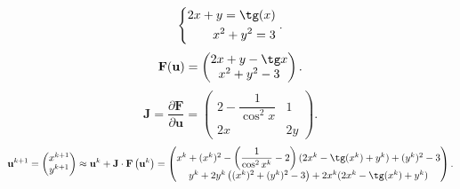 \documentclass[a4paper]{article}
\title{}
\begin{document}
	\maketitle
\[
\left\{
\begin{aligned}
	2 x +y = \tg (x) \\
	x^2 +y^2 =3
\end{aligned}
\right.
.\] 
\[
	\mathbf{F}(\mathbf{u})=
	\begin{pmatrix} 2x+y -\tg x \\ x^2+y^2-3 \end{pmatrix} 
.\] 
\[
	\mathbf{J}= \frac{\partial \mathbf{F}}{\partial \mathbf{u}}=
	\begin{pmatrix} 2 -\dfrac{1}{\cos^2 x}& 1\\ 2x& 2y \end{pmatrix} 
.\] 
\[
	\mathbf{u}^{k+1} =\begin{pmatrix} x^{k+1}\\ y^{k+1} \end{pmatrix} \approx \mathbf{u}^k+ \mathbf{J}\cdot\mathbf{F}\left(\mathbf{u}^k\right)=\begin{pmatrix}x^k+(x^k)^2-\left(\dfrac{1}{\cos^2 x^k}-2\right) (2 x^k-\tg (x^k)+y^k)+(y^k)^2-3\\y^k+2 y^k
	\left((x^k)^2+(y^k)^2-3\right)+2 x^k (2 x^k-\tg (x^k)+y^k)
  \end{pmatrix} .\] 
\end{document}
